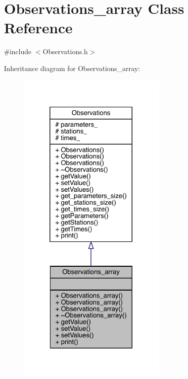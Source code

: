 \hypertarget{class_observations__array}{}\section{Observations\+\_\+array Class Reference}
\label{class_observations__array}


{\ttfamily \#include $<$Observations.\+h$>$}



Inheritance diagram for Observations\+\_\+array\+:
\nopagebreak
\begin{figure}[H]
\begin{center}
\leavevmode
\includegraphics[width=205pt]{class_observations__array__inherit__graph}
\end{center}
\end{figure}



